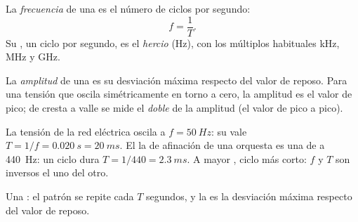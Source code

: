 \begin{definition}[Frecuencia]\label{def:g10:signals-and-waves:frequency}
La \emph{frecuencia} de una  es el
número de ciclos por segundo:
\[
f = \frac{1}{T} .
\]
Su , un ciclo por segundo, es el \emph{hercio}
(\unit{Hz}), con los múltiplos habituales \unit{kHz}, \unit{MHz} y
\unit{GHz}.
\end{definition}

\begin{definition}[Amplitud]\label{def:g10:signals-and-waves:amplitude}
La \emph{amplitud} de una  es su
desviación máxima respecto del valor de reposo. Para una tensión que
oscila simétricamente en torno a cero, la amplitud es el valor de pico;
de cresta a valle se mide el \emph{doble} de la amplitud (el valor de
pico a pico).
\end{definition}

\begin{example}\label{ex:g10:signals-and-waves:mains}
La tensión de la red eléctrica oscila a $f = \qty{50}{Hz}$: su 
vale $T = 1/f = \qty{0.020}{s} = \qty{20}{ms}$. El la de afinación de una
orquesta es una  de  a \qty{440}{Hz}: un ciclo dura
$T = 1/440 = \qty{2.3}{ms}$. A mayor , ciclo más corto: $f$ y
$T$ son inversos el uno del otro.
\end{example}

\begin{omfigure}

{\small Una : el patrón se repite cada $T$ segundos, y la
 es la desviación máxima respecto del valor de reposo.}
\end{omfigure}

